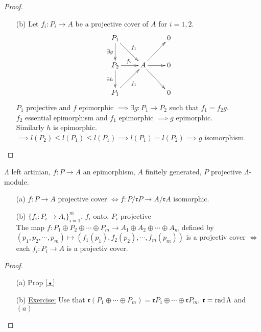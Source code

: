 \begin{thm}
\begin{proof}
\begin{enumerate}
\item[(b)] Let $f_i : P_i \to A$ be a projective cover of $A$ for $i = 1, 2$.
\[\xymatrix{
P_1 \ar[dr]^{f_1} \ar[d]_{\exists g}&& 0\\
P_2 \ar[r]^{f_2} \ar[d]_{\exists h} & A \ar[r]\ar[dr]\ar[ur] & 0\\
P_1 \ar[ur]_{f_1} && 0
}\]
$P_1$ projective and $f$ epimorphic $\implies \exists g: P_1 \to P_2$ such that $f_1 = f_2g$.\\
$f_2$ essential epimorphism and $f_1$ epimorphic $\implies g$ epimorphic.\\
Similarly $h$ is epimorphic.\\
$\implies l(P_2) \leq l(P_1) \leq l(P_1) \implies l(P_1) = l(P_2) \implies g$ isomorphism. 
\end{enumerate}
\end{proof}
\end{thm}

\begin{prop}
\label{prop:proj_covers->top_iso}
$\Lambda$ left artinian, $f: P \to A$ an epimorphism, $A$ finitely generated, $P$ projective $\Lambda$-module.
\begin{enumerate}
\item[(a)] $f:P \to A$ projective cover $\iff \overline{f}: P/\mathfrak{r}P \to A/\mathfrak{r}A$ isomorphic.
\item[(b)] $\{ f_i : P_i \to A_i \}_{i=1}^m$, $f_i$ onto, $P_i$ projective\\
The map $f: P_1 \oplus P_2 \oplus \cdots \oplus P_m \to A_1 \oplus A_2 \oplus \cdots \oplus A_m $ defined by $(p_1, p_2, \cdots , p_m) \mapsto (f_1(p_1), f_2(p_2), \cdots , f_m(p_m))$ is a projectiv cover $\iff$ each $f_i:P_i \to A$ is a projectiv cover.
\end{enumerate}

\begin{proof}
\begin{enumerate}
\item[]
\item[(a)] Prop \ref{•}
\item[(b)] \underline{Exercise:} Use that $\mathfrak{r}(P_1 \oplus \cdots \oplus P_m) = \mathfrak{r}P_1 \oplus \cdots \oplus \mathfrak{r}P_m$, $\mathfrak{r} = \operatorname{rad}\nolimits \Lambda$ and $(a)$
\end{enumerate}
\end{proof}
\end{prop}

